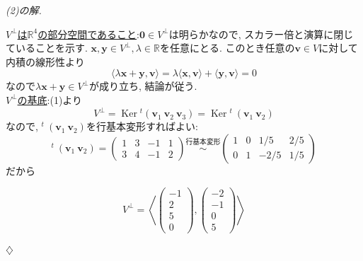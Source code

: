 \documentclass[titlepage]{jsarticle}
\numberwithin{equation}{section}
\newcommand{\R}{\mathbb{R}}%
\newcommand{\Ker}{\operatorname{Ker}}
\newenvironment{kaitou}[1][解]{%
\begin{proofbox}%
\textit{#1. }\ignorespaces
}{%
\hfill$\diamondsuit$%
\end{proofbox}%
}
\begin{document}
\begin{kaitou}[(2)の解]
\uline{$V^{\perp}$は$\R^4$の部分空間であること}:\:$\bm{0}\in V^\perp$は明らかなので, スカラー倍と演算に閉じていることを示す. $\bm{x}, \bm{y}\in V^\perp, \lambda\in\R$を任意にとる. このとき任意の$\bm{v}\in V$に対して内積の線形性より
\[
\langle \lambda\bm{x}+\bm{y}, \bm{v} \rangle = \lambda\langle \bm{x}, \bm{v}\rangle + \langle \bm{y}, \bm{v} \rangle = 0
\]
なので$\lambda\bm{x}+\bm{y} \in V^\perp$が成り立ち, 結論が従う.\\
\uline{$V^\perp$の基底}:\:(1)より
\[
V^\perp = \Ker {}^t\!(\bm{v}_1\:\bm{v}_2\:\bm{v}_3) = \Ker {}^t\:(\bm{v}_1\:\bm{v}_2)
\]
なので, ${}^t\:(\bm{v}_1\:\bm{v}_2)$を行基本変形すればよい:
\[
{}^t\:(\bm{v}_1\:\bm{v}_2) = 
\begin{pmatrix}
1 & 3 & -1 & 1\\
3 & 4 & -1 & 2
\end{pmatrix}
\overset{\text{行基本変形}}{\sim}
\begin{pmatrix}
1 & 0 & 1/5 & 2/5\\
0 & 1 & -2/5 & 1/5
\end{pmatrix}
\]
だから
\begin{answerbox}
\[
V^\perp = \left\langle 
\begin{pmatrix}
-1\\
2\\
5\\
0
\end{pmatrix}
,
\begin{pmatrix}
-2\\
-1\\
0\\
5
\end{pmatrix}
\right\rangle
\]
\end{answerbox}
\end{kaitou}
\end{document}
